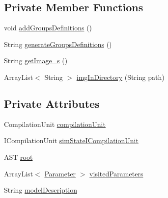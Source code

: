 \subsection*{Private Member Functions}
\begin{DoxyCompactItemize}
\item 
void \hyperlink{classit_1_1isislab_1_1masonassisteddocumentation_1_1mason_1_1analizer_1_1_sim_state_analizer_a686b1fdc9c973e289069372ada60c1c8}{add\-Groups\-Definitions} ()
\item 
String \hyperlink{classit_1_1isislab_1_1masonassisteddocumentation_1_1mason_1_1analizer_1_1_sim_state_analizer_a08b8bb716aa03be25e82146ecbc77612}{generate\-Groups\-Definitions} ()
\item 
String \hyperlink{classit_1_1isislab_1_1masonassisteddocumentation_1_1mason_1_1analizer_1_1_sim_state_analizer_abff770f4e110a106f049361915f1f390}{get\-Image\-\_\-s} ()
\item 
Array\-List$<$ String $>$ \hyperlink{classit_1_1isislab_1_1masonassisteddocumentation_1_1mason_1_1analizer_1_1_sim_state_analizer_acff4ec3593b77c94e197a43f9286ee36}{img\-In\-Directory} (String path)
\end{DoxyCompactItemize}
\subsection*{Private Attributes}
\begin{DoxyCompactItemize}
\item 
Compilation\-Unit \hyperlink{classit_1_1isislab_1_1masonassisteddocumentation_1_1mason_1_1analizer_1_1_sim_state_analizer_a56f6f2a78ed4ed2aca4b727f945a32ed}{compilation\-Unit}
\item 
I\-Compilation\-Unit \hyperlink{classit_1_1isislab_1_1masonassisteddocumentation_1_1mason_1_1analizer_1_1_sim_state_analizer_a5a4cf52aff7f9d349b30f11960687b9c}{sim\-State\-I\-Compilation\-Unit}
\item 
A\-S\-T \hyperlink{classit_1_1isislab_1_1masonassisteddocumentation_1_1mason_1_1analizer_1_1_sim_state_analizer_a1e8de067ee5d4d1fc55506d4ae51465b}{root}
\item 
Array\-List$<$ \hyperlink{classit_1_1isislab_1_1masonassisteddocumentation_1_1mason_1_1analizer_1_1_parameter}{Parameter} $>$ \hyperlink{classit_1_1isislab_1_1masonassisteddocumentation_1_1mason_1_1analizer_1_1_sim_state_analizer_af04494d03ea6d22a94201b5c08706b67}{visited\-Parameters}
\item 
String \hyperlink{classit_1_1isislab_1_1masonassisteddocumentation_1_1mason_1_1analizer_1_1_sim_state_analizer_ae2584c7bd2e47283b4693d7a7c4b39bd}{model\-Description}
\end{DoxyCompactItemize}
